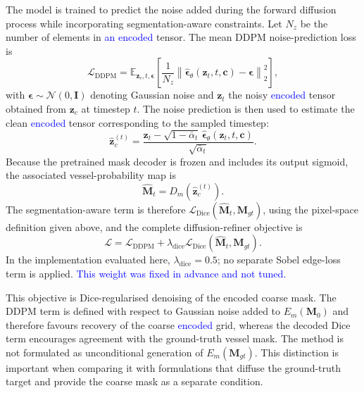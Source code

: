 \documentclass[jimaging,article,submit,pdftex,moreauthors]
  {Definitions/mdpi}
\DeclareRobustCommand{\rev}[1]{\textcolor{blue}{#1}}
\DeclareRobustCommand{\rev}[1]{#1}
\begin{document}
The model is trained to predict the noise added during the forward diffusion process while incorporating segmentation-aware constraints. Let $N_z$ be the number of elements in \rev{an encoded} tensor. The mean DDPM noise-prediction loss is
\begin{equation}
\mathcal{L}_{\text{DDPM}}=
\mathbb{E}_{\mathbf{z}_c,t,\boldsymbol{\epsilon}}\left[
\frac{1}{N_z}\left\|
\hat{\boldsymbol{\epsilon}}_\theta(\mathbf{z}_t,t,\mathbf{c})-
\boldsymbol{\epsilon}
\right\|_2^2
\right],
\end{equation}
with $\boldsymbol{\epsilon}\sim\mathcal{N}(0,\mathbf{I})$ denoting Gaussian noise and $\mathbf{z}_t$ the noisy \rev{encoded} tensor obtained from $\mathbf{z}_c$ at timestep $t$.
The noise prediction is then used to estimate the clean \rev{encoded} tensor corresponding to the sampled timestep:
\begin{equation}
\hat{\mathbf{z}}_c^{(t)}=
\frac{\mathbf{z}_t-
\sqrt{1-\bar{\alpha}_t}\,
\hat{\boldsymbol{\epsilon}}_\theta(\mathbf{z}_t,t,\mathbf{c})}
{\sqrt{\bar{\alpha}_t}}.
\end{equation}
Because the pretrained mask decoder is frozen and includes its output sigmoid, the associated vessel-probability map is
\begin{equation}
\hat{\mathbf{M}}_t=D_m\!\left(\hat{\mathbf{z}}_c^{(t)}\right).
\end{equation}
The segmentation-aware term is therefore $\mathcal{L}_{\text{Dice}}(\hat{\mathbf{M}}_t,\mathbf{M}_{gt})$, using the pixel-space definition given above, and the complete diffusion-refiner objective is
\begin{equation}
\mathcal{L}=
\mathcal{L}_{\text{DDPM}}+
\lambda_{\text{dice}}
\mathcal{L}_{\text{Dice}}(\hat{\mathbf{M}}_t,\mathbf{M}_{gt}).
\end{equation}
In the implementation evaluated here, $\lambda_{\text{dice}}=0.5$; no separate Sobel edge-loss term is applied. \rev{This weight was fixed in advance and not tuned.}

This objective is Dice-regularised denoising of the encoded coarse mask. The DDPM term is defined with respect to Gaussian noise added to $E_m(\mathbf{M}_0)$ and therefore favours recovery of the coarse \rev{encoded} grid, whereas the decoded Dice term encourages agreement with the ground-truth vessel mask. The method is not formulated as unconditional generation of $E_m(\mathbf{M}_{gt})$. This distinction is important when comparing it with formulations that diffuse the ground-truth target and provide the coarse mask as a separate condition.
\end{document}
